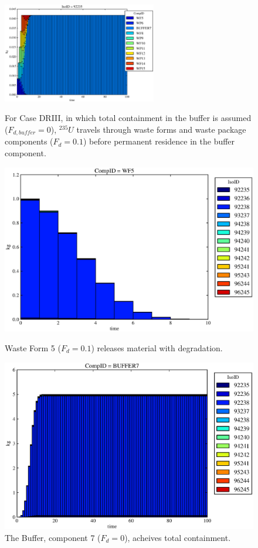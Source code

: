 \begin{figure}[ht]
\centering
\includegraphics[width=0.6\textwidth]{./chapters/demonstration/base/drIII.eps}
\caption[$^{235}U$ residence. Degradation Rate Buffer No Release.]{
For Case DRIII, in which total containment in the buffer is assumed ($F_{d,buffer}=0$), 
$^{235}U$ travels through waste forms and waste package components ($F_d = 0.1$) before 
permanent residence in the buffer component.
}
\label{fig:drIIIall}
\begin{minipage}[b]{0.45\linewidth}

  \includegraphics[width=\textwidth]{./chapters/demonstration/base/drIII1.eps}
  \caption[Case DRIII Waste Form Contaminants.]{
    Waste Form 5 ($F_d = 0.1$) releases material with degradation. 
    }
  \label{fig:drIIIwf5}
  
  \includegraphics[width=\textwidth]{./chapters/demonstration/base/drIII3.eps}
  \caption[Case DRIII Buffer Contaminants]{
    The Buffer, component 7 ($F_d=0$), acheives total containment.
    }
  \label{fig:drIIIbuff}


\end{minipage}
\end{figure}
